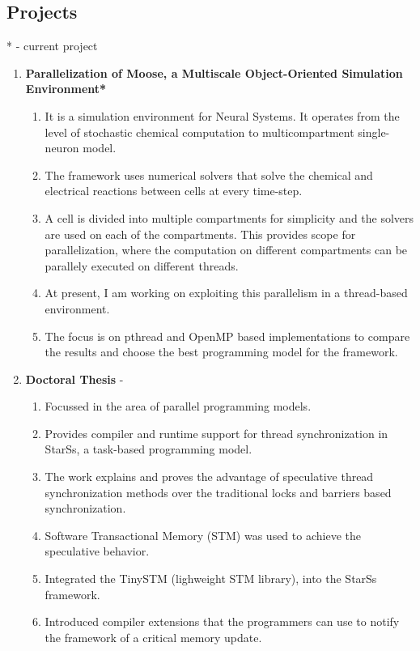 \documentclass[margin]{res}
\begin{document}
\begin{resume}
\section{Projects} 
* - current project \\
%
\begin{enumerate}
%
	   \item {\bf Parallelization of Moose, a Multiscale Object-Oriented Simulation Environment*}
			 \begin{enumerate}
				    \item It is a simulation environment for Neural Systems. It operates from the level of stochastic chemical computation to multicompartment single-neuron model.
				    \item The framework uses numerical solvers that solve the chemical and electrical reactions between cells at every time-step.
				    \item A cell is divided into multiple compartments for simplicity and the solvers are used on each of the compartments. This provides scope for parallelization, where the computation on different compartments can be parallely executed on different threads.
				    \item At present, I am working on exploiting this parallelism in a thread-based environment. 
				    \item The focus is on pthread and OpenMP based implementations to compare the results and choose the best programming model for the framework. 
			 \end{enumerate}
%
	   \item {\bf Doctoral Thesis} - 
			 \begin{enumerate}
				    \item Focussed in the area of parallel programming models.
				    \item Provides compiler and runtime support for thread synchronization in StarSs, a task-based programming model.
				    \item The work explains and proves the advantage of speculative thread synchronization methods over the traditional locks and barriers based synchronization.
				    \item Software Transactional Memory (STM) was used to achieve the speculative behavior.
				    \item Integrated the TinySTM (lighweight STM library), into the StarSs framework.
				    \item Introduced compiler extensions that the programmers can use to notify the framework of a critical memory update.

\end{enumerate}
\end{enumerate}
\end{resume}
\end{document}
